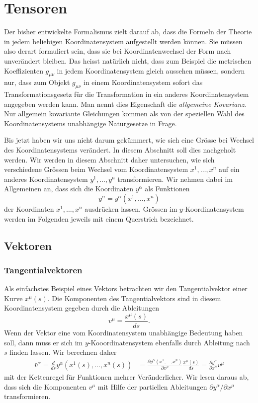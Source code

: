 %
%
%
\section{Tensoren}
Der bisher entwickelte Formalismus zielt darauf ab, dass die Formeln der
Theorie in jedem beliebigen Koordinatensystem aufgestellt werden können.
Sie müssen also derart formuliert sein, dass sie bei Koordinatenwechsel
der Form nach unverändert bleiben.
Das heisst natürlich nicht, dass zum Beispiel die metrischen Koeffizienten
$g_{\mu\nu}$ in jedem Koordinatensystem gleich aussehen müssen, sondern
nur, dass zum Objekt $g_{\mu\nu}$ in einem Koordinatensystem sofort
das Transformationsgesetz für die Transformation in ein anderes
Koordinatensystem angegeben werden kann.
Man nennt dies Eigenschaft die {\em allgemeine Kovarianz}.
Nur allgemein kovariante Gleichungen kommen als von der speziellen
Wahl des Koordinatensystems unabhängige Naturgesetze in Frage.

Bis jetzt haben wir uns nicht darum gekümmert, wie sich eine Grösse
bei Wechsel des Koordinatensystems verändert.
In diesem Abschnitt soll dies nachgeholt werden.
Wir werden in diesem Abschnitt daher untersuchen, wie sich verschiedene
Grössen beim Wechsel vom Koordinatensystem $x^1,\dots,x^n$ auf ein
anderes Koordinatensystem $y^1,\dots,y^n$ transformieren.
Wir nehmen dabei im Allgemeinen an, dass sich die Koordinaten $y^\alpha$
als Funktionen
\[
y^\alpha = y^\alpha(x^1,\dots,x^n)
\]
der Koordinaten $x^1,\dots,x^n$ ausdrücken lassen.
Grössen im $y$-Koordinatensystem werden im Folgenden jeweils mit
einem Querstrich bezeichnet.

\subsection{Vektoren}

\subsubsection{Tangentialvektoren}
Als einfachstes Beispiel eines Vektors betrachten wir den Tangentialvektor
einer Kurve $x^\mu(s)$.
Die Komponenten des Tangentialvektors sind in diesem Koordinatensystem
gegeben durch die Ableitungen
\[
v^\mu
=
\frac{x^\mu(s)}{ds}.
\]
Wenn der Vektor eine vom Koordinatensystem unabhängige Bedeutung haben soll,
dann muss er sich im $y$-Kooordinatensystem ebenfalls durch Ableitung nach
$s$ finden lassen.
Wir berechnen daher 
\begin{align}
\bar v^\alpha
=
\frac{d}{ds}y^\alpha(x^1(s),\dots,x^n(s))
&=
\frac{\partial y^\alpha(x^1,\dots,x^n)}{\partial x^\mu}\frac{x^\mu(s)}{ds}
=
\frac{\partial y^\alpha}{\partial x^\mu} v^\mu
\label{skript:trafo:kontra}
\end{align}
mit der Kettenregel für Funktionen mehrer Veränderlicher.
Wir lesen daraus ab, dass sich die Komponenten $v^\mu$ mit Hilfe der
partiellen Ableitungen $\partial y^\alpha/\partial x^\mu$ transformieren.

